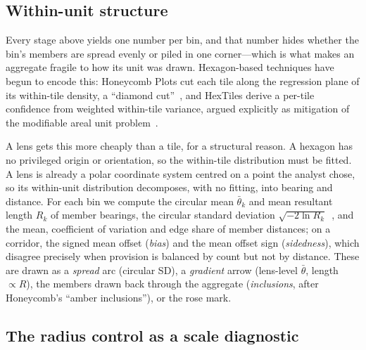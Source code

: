 \subsection{Within-unit structure}
\label{sec:within}

Every stage above yields one number per bin, and that number hides whether the
bin's members are spread evenly or piled in one corner---which is what makes an
aggregate fragile to how its unit was drawn. Hexagon-based techniques have
begun to encode this: Honeycomb Plots cut each tile along the regression plane
of its within-tile density, a ``diamond cut''~\cite{trautner2022honeycomb}, and
HexTiles derive a per-tile confidence from weighted within-tile variance, argued
explicitly as mitigation of the modifiable areal unit
problem~\cite{kawakami2024hextiles}.

A lens gets this more cheaply than a tile, for a structural reason. A hexagon
has no privileged origin or orientation, so the within-tile distribution must be
fitted. A lens is already a polar coordinate system centred on a point the
analyst chose, so its within-unit distribution decomposes, with no fitting,
into bearing and distance. For each bin we compute the circular mean
$\bar\theta_k$ and mean resultant length $R_k$ of member bearings, the circular
standard deviation $\sqrt{-2\ln R_k}$~\cite{mardia1999directional}, and the
mean, coefficient of variation and edge share of member distances; on a
corridor, the signed mean offset (\emph{bias}) and the mean offset sign
(\emph{sidedness}), which disagree precisely when provision is balanced by
count but not by distance. These are drawn as a \emph{spread} arc (circular SD),
a \emph{gradient} arrow (lens-level $\bar\theta$, length $\propto R$), the
members drawn back through the aggregate (\emph{inclusions}, after Honeycomb's
``amber inclusions''), or the rose mark.

\subsection{The radius control as a scale diagnostic}
\label{sec:elasticity}

